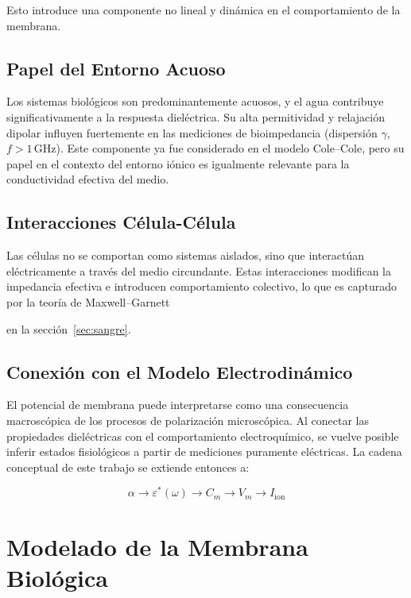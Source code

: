 \documentclass[12pt]{article}
\begin{document}
Esto introduce una componente no lineal y din\'amica en el comportamiento de la membrana.

\subsection{Papel del Entorno Acuoso}

Los sistemas biol\'ogicos son predominantemente acuosos, y el agua contribuye
significativamente a la respuesta diel\'ectrica. Su alta permitividad y relajaci\'on dipolar
influyen fuertemente en las mediciones de bioimpedancia (dispersi\'on $\gamma$, $f >
1\,\text{GHz}$). Este componente ya fue considerado en el modelo Cole--Cole, pero su papel en el
contexto
del entorno i\'onico es igualmente relevante para la conductividad efectiva del medio.

\subsection{Interacciones C\'elula-C\'elula}

Las c\'elulas no se comportan como sistemas aislados, sino que interact\'uan el\'ectricamente a
trav\'es del medio circundante. Estas interacciones modifican la impedancia efectiva e
introducen comportamiento colectivo, lo que es capturado por la teor\'ia de Maxwell--Garnett

en la secci\'on~\ref{sec:sangre}.

\subsection{Conexi\'on con el Modelo Electrodin\'amico}

El potencial de membrana puede interpretarse como una consecuencia macrosc\'opica de los
procesos de polarizaci\'on microsc\'opica. Al conectar las propiedades diel\'ectricas con el
comportamiento electroqu\'imico, se vuelve posible inferir estados fisiol\'ogicos a partir de
mediciones puramente el\'ectricas. La cadena conceptual de este trabajo se extiende entonces a:

\begin{equation}
\alpha \rightarrow \varepsilon^*(\omega) \rightarrow C_m \rightarrow V_m \rightarrow
I_{\text{ion}}
\end{equation}

\section{Modelado de la Membrana Biol\'ogica}
\end{document}
